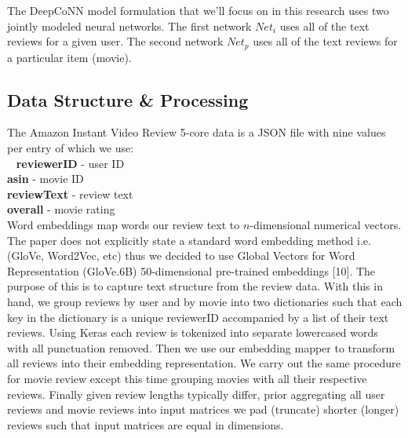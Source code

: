 \documentclass[10pt,twocolumn,letterpaper]{article}
\begin{document}
The DeepCoNN model formulation that we'll focus on in this research uses two jointly modeled neural networks. The first network $Net_{i}$ uses all of the text reviews for a given user. The second network $Net_{p}$ uses all of the text reviews for a particular item (movie).

\subsection{Data Structure \& Processing}
The Amazon Instant Video Review 5-core data is a JSON file with nine values per entry of which we use:\\
\ \newline
 \hspace*{10mm}  \textbf{reviewerID} - user ID \\ 
 \hspace*{10mm}  \textbf{asin} - movie ID \\
 \hspace*{10mm}  \textbf{reviewText} - review text \\
 \hspace*{10mm}  \textbf{overall} - movie rating \\

Word embeddings map words our review text to $n$-dimensional numerical vectors. The paper does not explicitly state a standard word embedding method i.e. (GloVe, Word2Vec, etc) thus we decided to use Global Vectors for Word Representation (GloVe.6B) 50-dimensional pre-trained embeddings [10]. The purpose of this is to capture text structure from the review data. With this in hand, we group reviews by user and by movie into two dictionaries such that each key in the dictionary is a unique reviewerID accompanied by a list of their text reviews. Using Keras each review is tokenized into separate lowercased words with all punctuation removed. Then we use our embedding mapper to transform all reviews into their embedding representation. We carry out the same procedure for movie review except this time grouping movies with all their respective reviews. Finally given review lengths typically differ, prior aggregating all user reviews and movie reviews into input matrices we pad (truncate) shorter (longer) reviews such that input matrices are equal in dimensions. 
\end{document}
